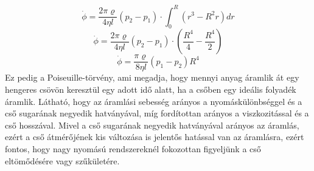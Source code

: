 \documentclass[a4paper,12pt]{article}
\begin{document}
\begin{equation}
    \dot{\phi} = \frac{2\pi\varrho}{4 \eta l} (p_2 - p_1) \cdot \int_0^R (r^3 - R^2 r) dr
\end{equation}
\begin{equation}
    \dot{\phi} = \frac{2\pi\varrho}{4 \eta l} (p_2 - p_1) \cdot \left(\frac{R^4}{4} - \frac{R^4}{2}\right)
\end{equation}
\begin{equation}
    \dot{\phi} = \frac{\pi \varrho}{8 \eta l} (p_1 - p_2) R^4
\end{equation}
Ez pedig a Poiseuille-törvény, ami megadja, hogy mennyi anyag áramlik át egy hengeres csövön keresztül egy adott idő alatt, ha a csőben egy ideális folyadék áramlik.
Látható, hogy az áramlási sebesség arányos a nyomáskülönbséggel és a cső sugarának negyedik hatványával, míg fordítottan arányos a viszkozitással és a cső hosszával.
Mivel a cső sugarának negyedik hatványával arányos az áramlás, ezért a cső átmérőjének kis változása is jelentős hatással van az áramlásra, ezért fontos, hogy
nagy nyomású rendszereknél fokozottan figyeljünk a cső eltömődésére vagy szűkületére.

\newpage
\end{document}
